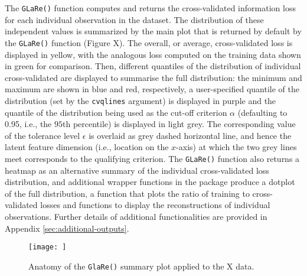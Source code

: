 The \texttt{GLaRe()} function computes and returns the cross-validated information loss for each individual observation in the dataset.
The distribution of these independent values is summarized by the main plot that is returned by default by the \texttt{GLaRe()} function (Figure {\color{red}X}).
The overall, or average, cross-validated loss is displayed in yellow, with the analogous loss computed on the training data shown in green for comparison.
Then, different quantiles of the distribution of individual cross-validated are displayed to summarise the full distribution: the minimum and maximum are shown in blue and red, respectively, a user-specified quantile of the distribution (set by the \texttt{cvqlines} argument) is displayed in purple and the quantile of the distribution being used as the cut-off criterion $\alpha$ (defaulting to 0.95, i.e., the $95$th percentile) is displayed in light grey.
The corresponding value of the tolerance level $\epsilon$ is overlaid as grey dashed horizontal line, and hence the latent feature dimension (i.e., location on the $x$-axis) at which the two grey lines meet corresponds to the qualifying criterion.
The \texttt{GLaRe()} function also returns a heatmap as an alternative summary of the individual cross-validated loss distribution, and additional wrapper functions in the package produce a dotplot of the full distribution, a function that plots the ratio of training to cross-validated losses and functions to display the reconstructions of individual observations. Further details of additional functionalities are provided in Appendix \ref{sec:additional-outputs}.

\begin{figure}
    \centering
    \texttt{[image: ]}
    \caption{Anatomy of the \texttt{GlaRe()} summary plot applied to the {\color{red}X} data.}
    \label{fig:enter-label}
\end{figure}